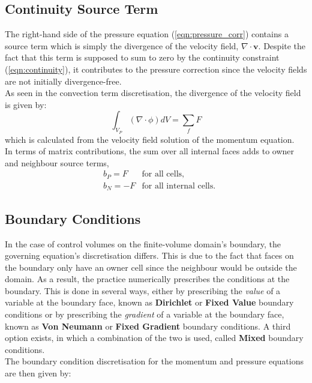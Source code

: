 \documentclass[final,3p,times,twocolumn]{elsarticle}
\begin{document}
\subsection{Continuity Source Term}
The right-hand side of the pressure equation (\ref{eqn:pressure_corr}) contains a source term which is simply the divergence of the velocity field, $\nabla \cdot \mathbf{v}$. Despite the fact that this term is supposed to sum to zero by the continuity constraint (\ref{eqn:continuity}), it contributes to the pressure correction since the velocity fields are not initially divergence-free. \\ As seen in the convection term discretisation, the divergence of the velocity field is given by: 
\begin{equation}
    \label{eqn:laplac_SgradPhi}
    \int_{V_P} (\nabla \cdot \phi)dV = \sum\limits _f F
\end{equation}
which is calculated from the velocity field solution of the momentum equation. \\ In terms of matrix contributions, the sum over all internal faces adds to owner and neighbour source terms,
\begin{align}
    \label{eqn:conv_matrix}
    &b_P = F & \text{for all cells,}\\
    &b_N = -F & \text{for all internal cells}.
\end{align}

\subsection{Boundary Conditions}
In the case of control volumes on the finite-volume domain's boundary, the governing equation's discretisation differs. This is due to the fact that faces on the boundary only have an owner cell since the neighbour would be outside the domain. As a result, the practice numerically prescribes the conditions at the boundary. This is done in several ways, either by prescribing the \textit{value} of a variable at the boundary face, known as \textbf{Dirichlet} or \textbf{Fixed Value} boundary conditions or by prescribing the \textit{gradient} of a variable at the boundary face, known as \textbf{Von Neumann} or \textbf{Fixed Gradient} boundary conditions. A third option exists, in which a combination of the two is used, called \textbf{Mixed} boundary conditions. \\
The boundary condition discretisation for the momentum and pressure equations are then given by:
\end{document}

